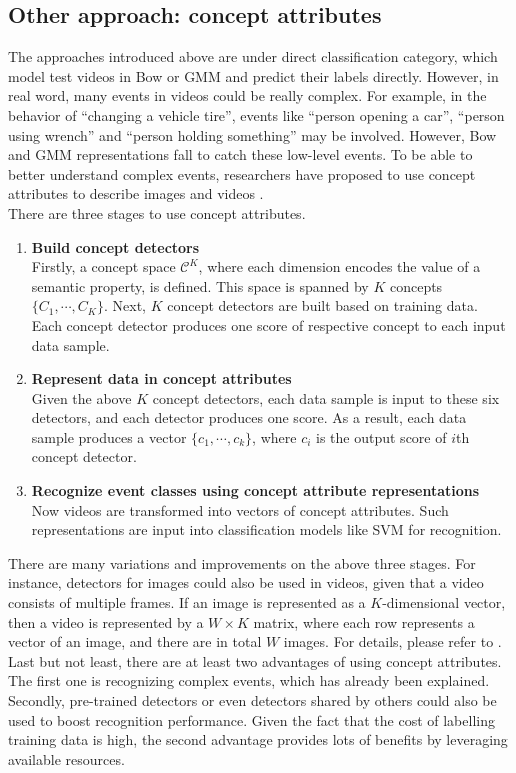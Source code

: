 \subsection{Other approach: concept attributes}
The approaches introduced above are under direct classification category, which model test videos in Bow or GMM and predict their labels directly. However, in real word, many events in videos could be really complex. For example, in the behavior of ``changing a vehicle tire'', events like ``person opening a car'', ``person using wrench'' and ``person holding something'' may be involved. However, Bow and GMM representations fall to catch these low-level events. To be able to better understand complex events, researchers have proposed to use concept attributes to describe images and videos \cite{liu2013video,natsev2010ibm, natarajan2011bbn}. \\

\noindent There are three stages to use concept attributes.
\begin{enumerate}
	\item{\bf Build concept detectors}\\
	Firstly, a concept space $\mathcal{C}^K$, where each dimension encodes the value of a semantic property, is defined. This space is spanned by $K$ concepts $\{C_1, \cdots, C_K\}$. Next, $K$ concept detectors are built based on training data. Each concept detector produces one score of respective concept to each input data sample. 
	\item{\bf Represent data in concept attributes}\\
	Given the above $K$ concept detectors, each data sample is input to these six detectors, and each detector produces one score. As a result, each data sample produces a vector $\{c_1,\cdots, c_k\}$, where $c_i$ is the output score of $i$th concept detector. 
	\item{\bf Recognize event classes using concept attribute representations}\\
	Now videos are transformed into vectors of concept attributes. Such representations are input into classification models like SVM for recognition.
\end{enumerate}

\noindent There are many variations and improvements on the above three stages. For instance, detectors for images could also be used in videos, given that a video consists of multiple frames. If an image is represented as a $K$-dimensional vector, then a video is represented by a $W \times K$ matrix, where each row represents a vector of an image, and there are in total $W$ images. For details, please refer to \cite{liu2013video}. \\

\noindent Last but not least, there are at least two advantages of using concept attributes. The first one is recognizing complex events, which has already been explained. Secondly, pre-trained detectors or even detectors shared by others could also be used to boost recognition performance. Given the fact that the cost of labelling training data is high, the second advantage provides lots of benefits by leveraging available resources. 

